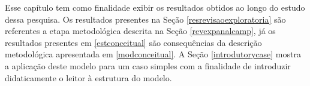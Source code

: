 Esse capítulo tem como finalidade exibir os resultados obtidos ao longo do estudo dessa pesquisa. Os resultados presentes na Seção \ref{resrevisaoexploratoria} são referentes a etapa metodológica descrita na Seção \ref{revexpanalcamp}, já os resultados presentes em \ref{estconceitual} são consequências da descrição metodológica apresentada em \ref{modconceitual}. A Seção \ref{introdutorycase} mostra a aplicação deste modelo para um caso simples com a finalidade de introduzir didaticamente o leitor à estrutura do modelo. 